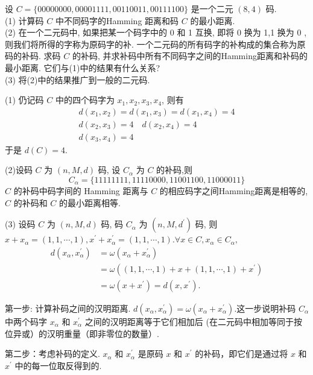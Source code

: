 \begin{exercise}
设 $ C=\{00000000,00001111,00110011,00111100\} $ 是一个二元 $ (8,4) $ 码.\\
(1) 计算码 $ C $ 中不同码字的Hamming 距离和码 $ C $ 的最小距离.\\
(2) 在一个二元码中, 如果把某一个码字中的 0 和 1 互换, 即将 0 换为 1,1 换为 0 , 则我们将所得的字称为原码字的补. 一个二元码的所有码字的补构成的集合称为原码的补码. 求码 $ C $ 的补码, 并求补码中所有不同码字之间的Hamming距离和补码的最小距离. 它们与(1)中的结果有什么关系?\\
(3) 将(2)中的结果推广到一般的二元码.
\end{exercise}
\begin{solution}
 (1) 仍记码 $ C $ 中的四个码字为 $ x_{1}, x_{2}, x_{3}, x_{4} $, 则有
$$
\begin{array}{c}
d\left(x_{1}, x_{2}\right)=d\left(x_{1}, x_{3}\right)=d\left(x_{1}, x_{4}\right)=4 \\
d\left(x_{2}, x_{3}\right)=4 \quad d\left(x_{2}, x_{4}\right)=4 \\
d\left(x_{3}, x_{4}\right)=4
\end{array}
$$
于是 $ d(C)=4 $.

(2)设码 $ C $ 为 $ (n, M, d) $ 码, 设 $ C_{\alpha} $ 为 $ C $ 的补码,则 $$ C_{\alpha}=\{11111111,11110000,11001100,11000011\} $$
$ C $ 的补码中码字间的 Hamming 距离与 $ C $ 的相应码字之间Hamming距离是相等的, $ C $ 的补码和 $ C $ 的最小距离相等.

(3) 设码 $ C $ 为 $ (n, M, d) $ 码, 码 $ C_{\alpha} $ 为 $ \left(n, M, d^{\prime}\right) $ 码, 则$ x+x_{\alpha}=(1,1, \cdots, 1), x^{\prime}+x_{\alpha}^{\prime}=(1,1, \cdots, 1)$.$\forall x \in C,  x_{\alpha} \in C_{\alpha},$
$$
\begin{aligned}
d\left(x_{\alpha}, x_{\alpha}^{\prime}\right) & =\omega\left(x_{\alpha}+x_{\alpha}^{\prime}\right) \\
& =\omega\left((1,1, \cdots, 1)+x+(1,1, \cdots, 1)+x^{\prime}\right) \\
& =\omega\left(x+x^{\prime}\right)=d\left(x, x^{\prime}\right) .
\end{aligned}
$$

第一步: 计算补码之间的汉明距离.
$ d\left(x_{\alpha}, x_{\alpha}^{\prime}\right)=\omega\left(x_{\alpha}+x_{\alpha}^{\prime}\right) $.这一步说明补码 $ C_{\alpha} $ 中两个码字 $ x_{\alpha} $ 和 $ x_{\alpha}^{\prime} $ 之间的汉明距离等于它们相加后 (在二元码中相加等同于按位异或）的汉明重量（即非零位的数量）.

第二步：考虑补码的定义.
$ x_{\alpha} $ 和 $ x_{\alpha}^{\prime} $ 是原码 $ x $ 和 $ x^{\prime} $ 的补码，即它们是通过将 $ x $ 和 $ x^{\prime} $ 中的每一位取反得到的.


\end{solution}

